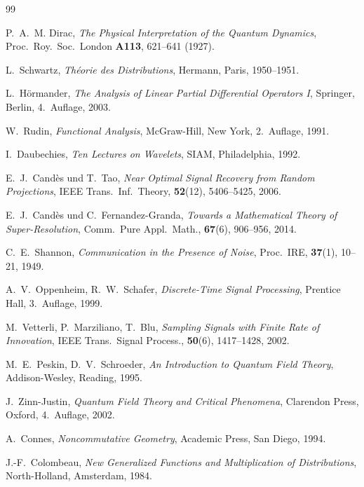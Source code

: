 ﻿\documentclass[a4paper,12pt]{article}
\theoremstyle{definition}
\begin{document}
\begin{thebibliography}{99}

P.~A.~M. Dirac,
\textit{The Physical Interpretation of the Quantum Dynamics},
Proc.\ Roy.\ Soc.\ London \textbf{A113}, 621--641 (1927).

L.~Schwartz,
\textit{Th\'eorie des Distributions},
Hermann, Paris, 1950--1951.

L.~H\"ormander,
\textit{The Analysis of Linear Partial Differential Operators I},
Springer, Berlin, 4.\ Auflage, 2003.

W.~Rudin,
\textit{Functional Analysis},
McGraw-Hill, New York, 2.\ Auflage, 1991.

I.~Daubechies,
\textit{Ten Lectures on Wavelets},
SIAM, Philadelphia, 1992.

E.~J.\ Cand\`es und T.~Tao,
\textit{Near Optimal Signal Recovery from Random Projections},
IEEE Trans.\ Inf.\ Theory, \textbf{52}(12), 5406--5425, 2006.

E.~J.\ Cand\`es und C.~Fernandez-Granda,
\textit{Towards a Mathematical Theory of Super-Resolution},
Comm.\ Pure Appl.\ Math., \textbf{67}(6), 906--956, 2014.

C.~E.\ Shannon,
\textit{Communication in the Presence of Noise},
Proc.\ IRE, \textbf{37}(1), 10--21, 1949.

A.~V.\ Oppenheim, R.~W.\ Schafer,
\textit{Discrete-Time Signal Processing},
Prentice Hall, 3.\ Auflage, 1999.

M.~Vetterli, P.~Marziliano, T.~Blu,
\textit{Sampling Signals with Finite Rate of Innovation},
IEEE Trans.\ Signal Process., \textbf{50}(6), 1417--1428, 2002.

M.~E.\ Peskin, D.~V.\ Schroeder,
\textit{An Introduction to Quantum Field Theory},
Addison-Wesley, Reading, 1995.

J.~Zinn-Justin,
\textit{Quantum Field Theory and Critical Phenomena},
Clarendon Press, Oxford, 4.\ Auflage, 2002.

A.~Connes,
\textit{Noncommutative Geometry},
Academic Press, San Diego, 1994.

J.-F.\ Colombeau,
\textit{New Generalized Functions and Multiplication of Distributions},
North-Holland, Amsterdam, 1984.


\end{thebibliography}
\end{document}

